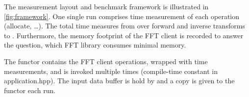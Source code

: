 The measurement layout and benchmark framework is illustrated in \cref{fig:framework}.
One single run comprises time measurement of each operation (allocate, \ldots). 
The total time measures from  over forward and inverse transforms to .
Furthermore, the memory footprint of the FFT client is recorded to answer the question, which FFT library consumes minimal memory.

The functor  contains the FFT client operations, wrapped with time measurements, and is invoked multiple times (compile-time constant in application.hpp). The input data buffer is hold by  and a copy is given to the  functor each run.

